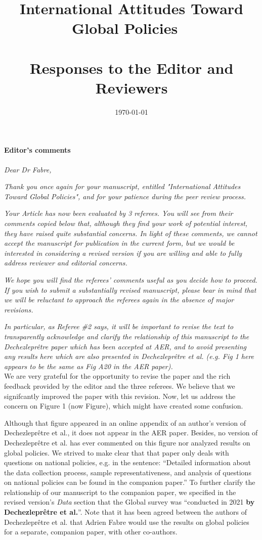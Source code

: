 \documentclass[12pt,english]{article}
\title{International Attitudes Toward Global Policies ~\\ ~\\ \textbf{Responses to the Editor and Reviewers}}
\date{\today}
\begin{document}
	
\maketitle

\paragraph*{Editor's comments}

\textit{Dear Dr Fabre,}

\textit{Thank you once again for your manuscript, entitled "International Attitudes Toward Global Policies", and for your patience during the peer review process.}

\textit{Your Article has now been evaluated by 3 referees. You will see from their comments copied below that, although they find your work of potential interest, they have raised quite substantial concerns. In light of these comments, we cannot accept the manuscript for publication in the current form, but we would be interested in considering a revised version if you are willing and able to fully address reviewer and editorial concerns.}

\textit{We hope you will find the referees' comments useful as you decide how to proceed. If you wish to submit a substantially revised manuscript, please bear in mind that we will be reluctant to approach the referees again in the absence of major revisions.}

\textit{In particular, as Referee \#2 says, it will be important to revise the text to transparently acknowledge and clarify the relationship of this manuscript to the Dechezleprêtre paper which has been accepted at AER, and to avoid presenting any results here which are also presented in Dechezleprêtre et al. (e.g. Fig 1 here appears to be the same as Fig A20 in the AER paper).}~\\


We are very grateful for the opportunity to revise the paper and the rich feedback provided by the editor and the three referees. We believe that we signifcantly improved the paper with this revision. Now, let us address the concern on Figure 1 (now Figure), which might have created some confusion.

Although that figure appeared in an online appendix of an author's version of Dechezleprêtre et al., it does not appear in the AER paper. Besides, no version of Dechezleprêtre et al. has ever commented on this figure nor analyzed results on global policies. We strived to make clear that that paper only deals with questions on national policies, e.g. in the sentence: ``Detailed information about the data collection process, sample representativeness, and analysis of questions on national policies can be found in the companion paper.'' To further clarify the relationship of our manuscript to the companion paper, we specified in the revised version's \textit{Data} section that the Global survey was  ``conducted in 2021 \textbf{by Dechezleprêtre et al.}''. Note that it has been agreed between the authors of Dechezleprêtre et al. that Adrien Fabre would use the results on global policies for a separate, companion paper, with other co-authors. 
~\\ ~\\
\end{document}
